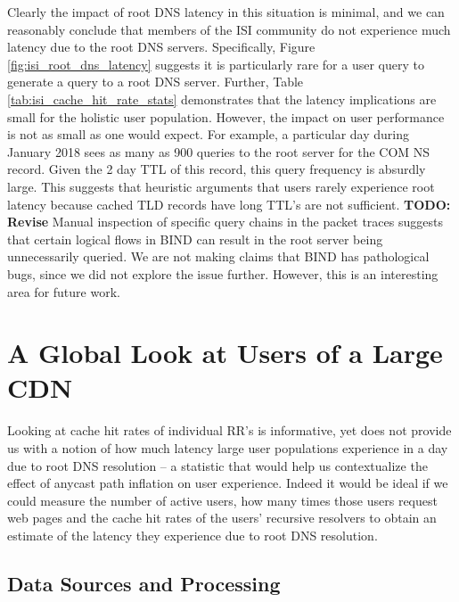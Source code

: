\documentclass[sigconf,nonacm,10pt]{acmart}
\begin{document}
Clearly the impact of root DNS latency in this situation is minimal, and
we can reasonably conclude that members of the ISI community do not
experience much latency due to the root DNS servers. Specifically,
Figure \ref{fig:isi_root_dns_latency} suggests it is particularly rare
for a user query to generate a query to a root DNS server. Further,
Table \ref{tab:isi_cache_hit_rate_stats} demonstrates that the latency
implications are small for the holistic user population. However, the
impact on user performance is not as small as one would expect. For
example, a particular day during January 2018 sees as many as 900
queries to the root server for the COM NS record. Given the 2 day TTL of
this record, this query frequency is absurdly large. This suggests that
heuristic arguments that users rarely experience root latency because
cached TLD records have long TTL's are not sufficient. \break 
\textbf{TODO: Revise} Manual inspection of specific query chains in the
packet traces suggests that certain logical flows in BIND can result in
the root server being unnecessarily queried. We are not making claims
that BIND has pathological bugs, since we did not explore the issue
further. However, this is an interesting area for future work.

\section{A Global Look at Users of a Large
CDN}\label{a-global-look-at-users-of-a-large-cdn-1}

\label{sec:rr_global_look} Looking at cache hit rates of individual RR's
is informative, yet does not provide us with a notion of how much
latency large user populations experience in a day due to root DNS
resolution -- a statistic that would help us contextualize the effect of
anycast path inflation on user experience. Indeed it would be ideal if
we could measure the number of active users, how many times those users
request web pages and the cache hit rates of the users' recursive
resolvers to obtain an estimate of the latency they experience due to
root DNS resolution.

\subsection{Data Sources and
Processing}\label{data-sources-and-processing-1}
\end{document}
